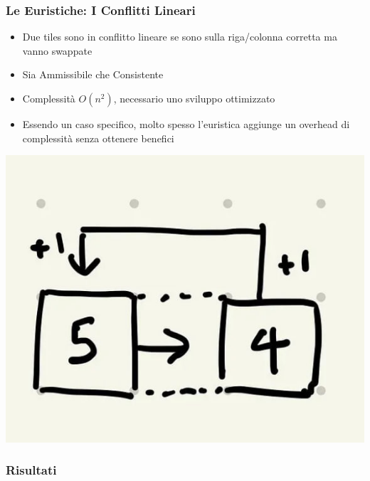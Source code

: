 \documentclass[11pt]{beamer}
\begin{document}
\begin{frame}
\frametitle{Le Euristiche: I Conflitti Lineari}
\begin{itemize}
    \item Due tiles sono in conflitto lineare se sono sulla riga/colonna corretta ma vanno swappate
    \item Sia Ammissibile che Consistente
    \item Complessità $O(n^2)$, necessario uno sviluppo ottimizzato 
    \item Essendo un caso specifico, molto spesso l'euristica aggiunge un overhead di complessità senza ottenere benefici
\end{itemize}
\includegraphics[scale=0.25]{linearconflict.jpg}
\centering
\end{frame}

\begin{frame}
\frametitle{Risultati}
\end{frame}
\end{document}
